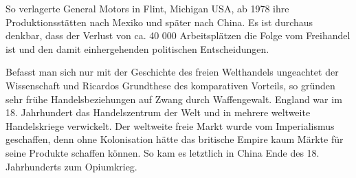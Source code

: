  
So verlagerte General Motors in Flint, Michigan USA, ab 1978 ihre Produktionsst{\"a}tten nach Mexiko und sp{\"a}ter nach China. Es ist durchaus denkbar, dass der Verlust von ca. 40 000 Arbeitspl{\"a}tzen die Folge vom Freihandel ist und den damit einhergehenden politischen Entscheidungen.\newline


Befasst man sich nur mit der Geschichte des freien Welthandels ungeachtet der Wissenschaft und Ricardos Grundthese des komparativen Vorteils, so gr{\"u}nden sehr fr{\"u}he Handelsbeziehungen auf Zwang durch Waffengewalt. \newline England war im 18. Jahrhundert das Handelszentrum der Welt und in mehrere weltweite Handelskriege verwickelt. Der weltweite freie Markt wurde vom Imperialismus geschaffen, denn ohne Kolonisation h{\"a}tte das britische Empire kaum M{\"a}rkte f{\"u}r seine Produkte schaffen k{\"o}nnen. So kam es letztlich in China Ende des 18. Jahrhunderts zum Opiumkrieg. \newline

